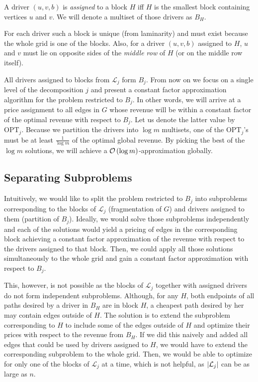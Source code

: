 \begin{definition}
A driver $(u,v,b)$ is \emph{assigned} to a block $H$ iff $H$ is the smallest block containing vertices $u$ and $v$.
We will denote a multiset of those drivers as $B_H$.
\end{definition}

For each driver such a block is unique (from laminarity) and must exist because the whole grid is one of the blocks.
Also, for a driver $(u, v, b)$ assigned to $H$, $u$ and $v$ must lie on opposite sides of the \emph{middle row} of $H$
(or on the middle row itself).

All drivers assigned to blocks from $\mathcal{L}_j$ form $B_j$.
From now on we focus on a single level of the decomposition $j$ and present a constant factor approximation algorithm for the problem restricted to $B_j$.
In other words, we will arrive at a price assignment to all edges in $G$ whose revenue will be within a constant factor of the optimal revenue with respect to $B_j$.
Let us denote the latter value by $\mathrm{OPT}_j$.
Because we partition the drivers into $\log m$ multisets, one of the $\mathrm{OPT}_j$'s must be at least $\frac{1}{\log m}$ of the optimal global revenue.
By picking the best of the $\log m$ solutions, we will achieve a $\mathcal{O} \left( \log m \right)$-approximation globally.

\subsection{Separating Subproblems}

Intuitively, we would like to split the problem restricted to $B_j$ into subproblems corresponding to the blocks of $\mathcal{L}_j$ (fragmentation of $G$)
and drivers assigned to them (partition of $B_j$).
Ideally, we would solve those subproblems independently and each of the solutions would yield a pricing of edges in the corresponding block
achieving a constant factor approximation of the revenue with respect to the drivers assigned to that block.
Then, we could apply all those solutions simultaneously to the whole grid and gain a constant factor approximation with respect to $B_j$.

This, however, is not possible as the blocks of $\mathcal{L}_j$ together with assigned drivers do not form independent subproblems.
Although, for any $H$, both endpoints of all paths desired by a driver in $B_H$ are in block $H$,
a cheapest path desired by her may contain edges outside of $H$.
The solution is to extend the subproblem corresponding to $H$ to include some of the edges outside of $H$ and optimize their prices
with respect to the revenue from $B_H$.
If we did this naively and added all edges that could be used by drivers assigned to $H$,
we would have to extend the corresponding subproblem to the whole grid.
Then, we would be able to optimize for only one of the blocks of $\mathcal{L}_j$ at a time,
which is not helpful, as $\left| \mathcal{L}_j \right|$ can be as large as $n$.

